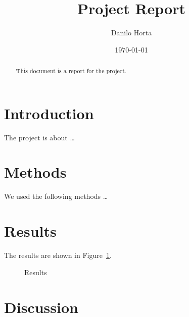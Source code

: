 \documentclass{article}
\begin{document}
\title{Project Report}
\author{Danilo Horta}
\date{\today}
\maketitle

\begin{abstract}
This document is a report for the project.
\end{abstract}

\section{Introduction}
The project is about \ldots

\section{Methods}
We used the following methods \ldots

\section{Results}
The results are shown in Figure~\ref{fig:results}.

\begin{figure}
\caption{Results}
\label{fig:results}
\end{figure}

\section{Discussion}
\end{document}
